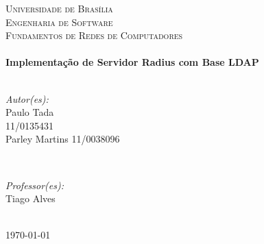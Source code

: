\begin{titlepage}

\center %
 

\textsc{\LARGE Universidade de Brasília}\\[1.5cm]	%
\textsc{\Large Engenharia de Software}\\[0.5cm]		%
\textsc{\large Fundamentos de Redes de Computadores}\\[0.5cm]		%


\HRule \\[0.4cm]
{ \huge \bfseries Implementação de Servidor Radius com Base LDAP}\\[0.4cm] %
\HRule \\[1.5cm]
 

\begin{minipage}{0.4\textwidth}
\begin{flushleft} \large
\emph{Autor(es):}\\
Paulo Tada\\ 11/0135431 \\%
Parley Martins 11/0038096
\end{flushleft}
\end{minipage}
~
\begin{minipage}{0.4\textwidth}
\begin{flushright} \large
\emph{Professor(es):} \\
Tiago Alves %
\end{flushright}
\end{minipage}\\[4cm]


{\large \today}\\[3cm] %



\vfill %

\end{titlepage}
